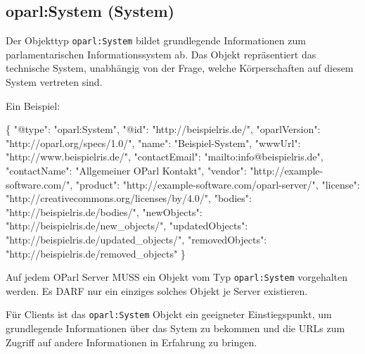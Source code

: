 \documentclass[,a4paper]{article}
\newenvironment{Shaded}{}{}
\newcommand{\DataTypeTok}[1]{\textcolor[rgb]{0.56,0.13,0.00}{{#1}}}
\newcommand{\StringTok}[1]{\textcolor[rgb]{0.25,0.44,0.63}{{#1}}}
\newcommand{\NormalTok}[1]{{#1}}
\begin{document}
\subsection{oparl:System (System)}\label{oparlux5fsystem}

Der Objekttyp \texttt{oparl:System} bildet grundlegende Informationen
zum parlamentarischen Informationssystem ab. Das Objekt repräsentiert
das technische System, unabhängig von der Frage, welche Körperschaften
auf diesem System vertreten sind.

Ein Beispiel:

\begin{Shaded}
\begin{Highlighting}[]
\NormalTok{\{}
    \DataTypeTok{"@type"}\NormalTok{: }\StringTok{"oparl:System"}\NormalTok{,}
    \DataTypeTok{"@id"}\NormalTok{: }\StringTok{"http://beispielris.de/"}\NormalTok{,}
    \DataTypeTok{"oparlVersion"}\NormalTok{: }\StringTok{"http://oparl.org/specs/1.0/"}\NormalTok{,}
    \DataTypeTok{"name"}\NormalTok{: }\StringTok{"Beispiel-System"}\NormalTok{,}
    \DataTypeTok{"wwwUrl"}\NormalTok{: }\StringTok{"http://www.beispielris.de/"}\NormalTok{,}
    \DataTypeTok{"contactEmail"}\NormalTok{: }\StringTok{"mailto:info@beispielris.de"}\NormalTok{,}
    \DataTypeTok{"contactName"}\NormalTok{: }\StringTok{"Allgemeiner OParl Kontakt"}\NormalTok{,}
    \DataTypeTok{"vendor"}\NormalTok{: }\StringTok{"http://example-software.com/"}\NormalTok{,}
    \DataTypeTok{"product"}\NormalTok{: }\StringTok{"http://example-software.com/oparl-server/"}\NormalTok{,}
    \DataTypeTok{"license"}\NormalTok{: }\StringTok{"http://creativecommons.org/licenses/by/4.0/"}\NormalTok{,}
    \DataTypeTok{"bodies"}\NormalTok{: }\StringTok{"http://beispielris.de/bodies/"}\NormalTok{,}
    \DataTypeTok{"newObjects"}\NormalTok{: }\StringTok{"http://beispielris.de/new_objects/"}\NormalTok{,}
    \DataTypeTok{"updatedObjects"}\NormalTok{: }\StringTok{"http://beispielris.de/updated_objects/"}\NormalTok{,}
    \DataTypeTok{"removedObjects"}\NormalTok{: }\StringTok{"http://beispielris.de/removed_objects"}
\NormalTok{\}}
\end{Highlighting}
\end{Shaded}

Auf jedem OParl Server MUSS ein Objekt vom Typ \texttt{oparl:System}
vorgehalten werden. Es DARF nur ein einziges solches Objekt je Server
existieren.

Für Clients ist das \texttt{oparl:System} Objekt ein geeigneter
Einstiegspunkt, um grundlegende Informationen über das Sytem zu bekommen
und die URLs zum Zugriff auf andere Informationen in Erfahrung zu
bringen.
\end{document}
